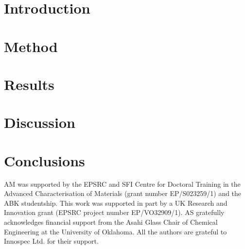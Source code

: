 \documentclass[journal=jctcce,manuscript=article]{achemso}
\begin{document}
\section{Introduction}



\section{Method}
\label{sec:method}



\section{Results}



\section{Discussion}



\section{Conclusions}



\begin{acknowledgement}
AM was supported by the EPSRC  and SFI Centre for Doctoral Training in the
Advanced Characterisation of Materials (grant number  EP/S023259/1) and the ABK
studentship. This work was supported in part by a UK Research and Innovation
grant (EPSRC project number EP/VO32909/1). AS gratefully acknowledges financial
support from the Asahi Glass Chair of Chemical Engineering at the University of
Oklahoma. All the authors are grateful to Innospec Ltd. for their support.
\end{acknowledgement}
\end{document}
